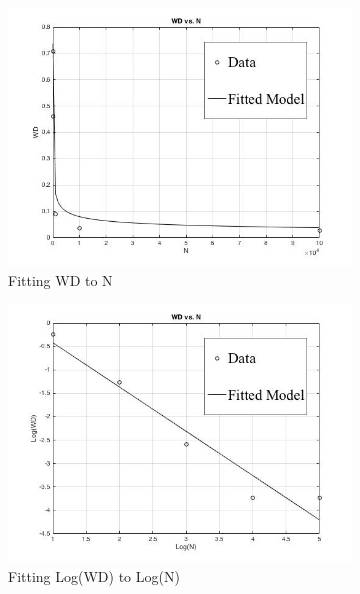 \documentclass[10pt]{article}
\begin{document}
\begin{figure}
\begin{subfigure}{.5\linewidth}
\centering
\includegraphics[scale = .4]{WDVSN1D.jpg}
\caption{Fitting WD to N}
\label{fig:FittingError}
\end{subfigure}%
\begin{subfigure}{.5\linewidth}
\centering
\includegraphics[scale = .4]{LogWDVSN1D.jpg}
\caption{Fitting Log(WD) to Log(N)}
\label{fig: FittingLogError}
\end{subfigure}\\[1ex]
\begin{subfigure}{\linewidth}
\centering

\end{subfigure}
\end{figure}
\end{document}
